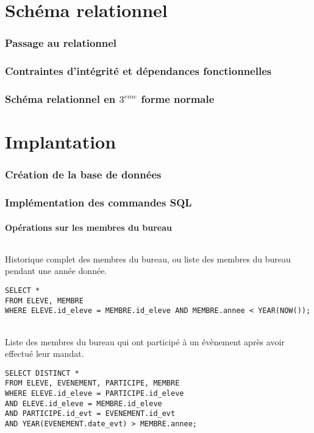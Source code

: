 \documentclass[a4paper, 11pt]{article}
\begin{document}
\newpage
\part{Schéma relationnel}
\setcounter{section}{0}
\section{Passage au relationnel}
\section{Contraintes d'intégrité et dépendances fonctionnelles}
\section{Schéma relationnel en $3^{eme}$ forme normale}
\newpage
\part{Implantation}
\setcounter{section}{0}
\section{Création de la base de données}
\section{Implémentation des commandes SQL}
\subsection{Opérations sur les membres du bureau}
\paragraph{}
Historique complet des membres du bureau, ou liste des membres du bureau pendant une année donnée.
\begin{verbatim}
SELECT *
FROM ELEVE, MEMBRE
WHERE ELEVE.id_eleve = MEMBRE.id_eleve AND MEMBRE.annee < YEAR(NOW());
\end{verbatim}
\paragraph{}
Liste des membres du bureau qui ont participé à un évènement après avoir effectué leur mandat.
\begin{verbatim}
SELECT DISTINCT *
FROM ELEVE, EVENEMENT, PARTICIPE, MEMBRE
WHERE ELEVE.id_eleve = PARTICIPE.id_eleve
AND ELEVE.id_eleve = MEMBRE.id_eleve
AND PARTICIPE.id_evt = EVENEMENT.id_evt
AND YEAR(EVENEMENT.date_evt) > MEMBRE.annee;
\end{verbatim}
\end{document}
